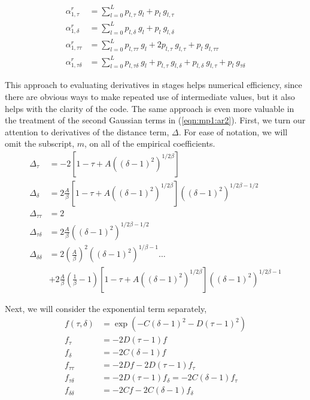 \begin{subequations}
\begin{align}
\alpha^r_{1,\tau} &= \sum^L_{l=0} p_{l,\tau}\ g_l + p_l\ g_{l,\tau}\\
\alpha^r_{1,\delta} &= \sum^L_{l=0} p_{l,\delta}\ g_l + p_l\ g_{l,\delta}\\
\alpha^r_{1,\tau\tau} &= \sum^L_{l=0} p_{l,\tau\tau}\ g_l + 2 p_{l,\tau}\ g_{l,\tau} + p_l\ g_{l,\tau\tau}\\
\alpha^r_{1,\tau\delta} &= \sum^L_{l=0} p_{l,\tau\delta}\ g_l + p_{l,\tau}\ g_{l,\delta} + p_{l,\delta}\ g_{l,\tau} + p_l\ g_{\tau\delta}
\end{align}
\end{subequations}

This approach to evaluating derivatives in stages helps numerical efficiency, since there are obvious ways to make repeated use of intermediate values, but it also helps with the clarity of the code.  The same approach is even more valuable in the treatment of the second Gaussian terms in (\ref{eqn:mp1:ar2}).  First, we turn our attention to derivatives of the distance term, $\Delta$.  For ease of notation, we will omit the subscript, $m$, on all of the empirical coefficients.
\begin{subequations}
\begin{align}
\Delta_\tau &= -2\left[ 1 - \tau + A\left((\delta-1)^2 \right)^{1/2\beta} \right]\\
\Delta_\delta &= 2 \frac{A}{\beta} \left[ 1 - \tau + A\left((\delta-1)^2 \right)^{1/2\beta} \right] \left((\delta-1)^2 \right)^{1/2\beta - 1/2}\\
\Delta_{\tau\tau} &= 2\\
\Delta_{\tau\delta} &= 2\frac{A}{\beta}\left((\delta-1)^2 \right)^{1/2\beta - 1/2}\\
\Delta_{\delta\delta} &= 2\left(\frac{A}{\beta}\right)^2 \left((\delta-1)^2\right)^{1/\beta-1} \ldots \nonumber\\
& + 2\frac{A}{\beta}\left(\frac{1}{\beta} - 1\right) \left[ 1 - \tau + A\left((\delta-1)^2 \right)^{1/2\beta} \right] \left((\delta-1)^2 \right)^{1/2\beta - 1}
\end{align}
\end{subequations}

Next, we will consider the exponential term separately,
\begin{subequations}
\begin{align}
f(\tau, \delta) &= \exp(-C (\delta-1)^2 - D(\tau-1)^2)\\
f_\tau &= -2D(\tau-1) f\\
f_\delta &= -2C(\delta-1) f\\
f_{\tau\tau} &= -2D f - 2D(\tau-1) f_\tau\\
f_{\tau\delta} &= -2D(\tau-1) f_\delta = -2C(\delta-1) f_\tau\\
f_{\delta\delta} &= -2C f - 2C(\delta-1) f_\delta
\end{align}
\end{subequations}

